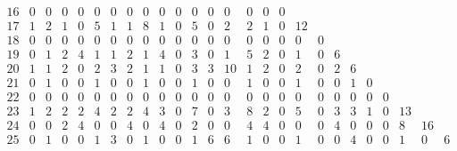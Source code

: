 \begin{landscape}
\[\begin{array}{c|ccccccccccccccccccccccccc}
16&  0&  0&  0&  0&  0&  0&  0&  0&  0&  0&  0&  0&  0&  0&  0&  0&   &   &   &   &   &   &   &   &   \\
17&  1&  2&  1&  0&  5&  1&  1&  8&  1&  0&  5&  0&  2&  2&  1&  0& 12&   &   &   &   &   &   &   &   \\
18&  0&  0&  0&  0&  0&  0&  0&  0&  0&  0&  0&  0&  0&  0&  0&  0&  0&  0&   &   &   &   &   &   &   \\
19&  0&  1&  2&  4&  1&  1&  2&  1&  4&  0&  3&  0&  1&  5&  2&  0&  1&  0&  6&   &   &   &   &   &   \\
20&  1&  1&  2&  0&  2&  3&  2&  1&  1&  0&  3&  3& 10&  1&  2&  0&  2&  0&  2&  6&   &   &   &   &   \\
21&  0&  1&  0&  0&  1&  0&  0&  1&  0&  0&  1&  0&  0&  1&  0&  0&  1&  0&  0&  1&  0&   &   &   &   \\
22&  0&  0&  0&  0&  0&  0&  0&  0&  0&  0&  0&  0&  0&  0&  0&  0&  0&  0&  0&  0&  0&  0&   &   &   \\
23&  1&  2&  2&  2&  4&  2&  2&  4&  3&  0&  7&  0&  3&  8&  2&  0&  5&  0&  3&  3&  1&  0& 13&   &   \\
24&  0&  0&  2&  4&  0&  0&  4&  0&  4&  0&  2&  0&  0&  4&  4&  0&  0&  0&  4&  0&  0&  0&  8& 16&   \\
25&  0&  1&  0&  0&  1&  3&  0&  1&  0&  0&  1&  6&  6&  1&  0&  0&  1&  0&  0&  4&  0&  0&  1&  0&  6\\
\end{array}
\]


\end{landscape}
